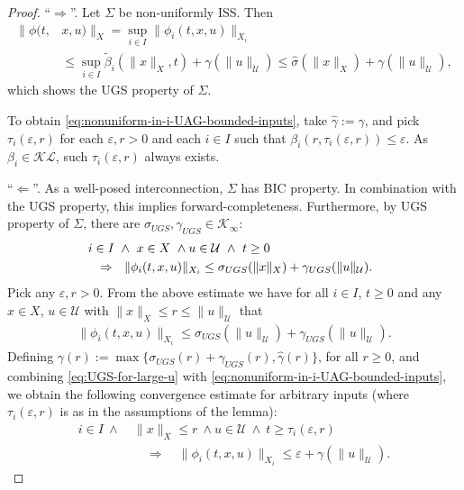 \documentclass[twocolumn]{IEEEtran} %
\theoremstyle{definition}
\newcommand{\Uc}{\mathcal{U}}%
\newcommand{\Kinf}{\mathcal{K_\infty}}%
\newcommand{\KL}{\mathcal{KL}}%
\newcommand{\ep}{\varepsilon}%
\newcommand \qrq   {\quad\Rightarrow\quad}
\newcommand \srs   {\ \ \Rightarrow\ \ }
\newcommand\q{\enquote}
\begin{document}
\begin{proof}
\q{$\Rightarrow$}. Let $\Sigma$ be non-uniformly ISS. Then
\begin{align*}
\|\phi(t,&x,u)\|_{X} =\sup_{i\in I}\|\phi_i(t,x,u)\|_{X_i}\\
 &\leq \sup_{i\in I}\tilde{\beta}_i(\|x\|_X,t) + \gamma(\|u\|_{\Uc}) \le \hat{\sigma}(\|x\|_X) + \gamma(\|u\|_{\Uc}),
\end{align*}
which shows the UGS property of $\Sigma$.

To obtain \eqref{eq:nonuniform-in-i-UAG-bounded-inputs}, take $\hat{\gamma}:=\gamma$, and pick $\tau_i(\ep,r)$ for each $\varepsilon,r>0$ and each $i\in I$ such that $\beta_i(r,\tau_i(\ep,r))\leq \varepsilon$. As $\beta_i\in\KL$, such $\tau_i(\ep,r)$ always exists. 

\q{$\Leftarrow$}. As a well-posed interconnection, $\Sigma$ has BIC property. In combination with the UGS property, this implies forward-completeness. Furthermore, by UGS property of $\Sigma$, there are $\sigma_{UGS},\gamma_{UGS}\in\Kinf$:
\begin{align}
&\hspace{-2mm} i\in I \ \wedge \ x\in X\ \wedge u\in \Uc \ \wedge\ t\geq0\nonumber\\
& \hspace{-2mm}\srs \|\phi_i(t, x, u)\|_{X_i} \leq \sigma_{UGS}(\|x\|_X) + \gamma_{UGS}(\|u\|_\Uc).
\label{lem7:help}
\end{align}
Pick any $\varepsilon,r>0$. From the above estimate we have for all $i\in I$, $t\geq 0$ 
and any $x\in X$, $u\in \Uc$ with $\|x\|_X \leq r\leq \|u\|_\Uc$ that
\begin{eqnarray}
\|\phi_i(t, x, u)\|_{X_i} \leq \sigma_{UGS}(\|u\|_\Uc) + \gamma_{UGS}(\|u\|_\Uc).
\label{eq:UGS-for-large-u}
\end{eqnarray}
Defining $\gamma(r):=\max\{\sigma_{UGS}(r) + \gamma_{UGS}(r), \hat{\gamma}(r)\}$, for all $r\geq 0$, and combining \eqref{eq:UGS-for-large-u} with 
\eqref{eq:nonuniform-in-i-UAG-bounded-inputs}, we obtain the following convergence estimate for arbitrary inputs (where $\tau_i(\ep,r)$ is as in the assumptions of the lemma):
\begin{align}
i\in I\ \wedge\ &\|x\|_X\leq r\ \wedge u\in \Uc \ \wedge\ t\geq\tau_i(\ep,r) \nonumber\\
&\qrq \|\phi_i(t, x, u)\|_{X_i} \leq \ep + \gamma(\|u\|_\Uc).
\label{eq:nonuniform-in-i-UAG}
\end{align}



\end{proof}
\end{document}
